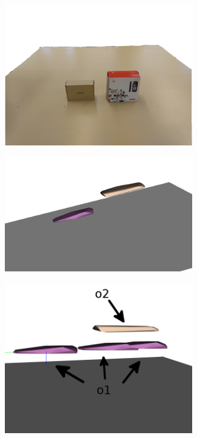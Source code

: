 \begin{figure}[h]
\centering
\begin{subfigure}[t]{0.3\textwidth}
\centering
\includegraphics[width=0.9\textwidth]{Img/convexhull/example_only_top_surfaces.png}
\caption{}\label{fig:rgb_top_surfaces_example}
\end{subfigure}
\begin{subfigure}[t]{0.3\textwidth}
\centering
\includegraphics[width=0.9\textwidth]{Img/convexhull/cv_top2.png}
\caption{}\label{fig:cv_top}
\end{subfigure}
\begin{subfigure}[t]{0.3\textwidth}
\centering
\includegraphics[width=0.9\textwidth]{Img/convexhull/cv_top_collision2.png}

\end{subfigure}
\end{figure}
